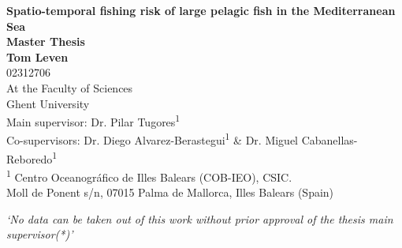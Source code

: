 \begin{titlepage}
	\begin{center}
		{\LARGE \textbf{Spatio-temporal fishing risk of large pelagic fish in the Mediterranean Sea}}\\[1cm]

		\textbf{Master Thesis}\\
		\textbf{Tom Leven}\\[0.5cm]
		02312706\\[1.5cm]

		At the Faculty of Sciences\\ Ghent University\\[1.5cm]

		Main supervisor: Dr. Pilar Tugores\textsuperscript{1}\\ Co-supervisors: Dr. Diego
		Alvarez-Berastegui\textsuperscript{1} \& Dr. Miguel Cabanellas-Reboredo\textsuperscript{1}\\[1cm]

		\textsuperscript{1} \small{Centro Oceanográfico de Illes Balears (COB-IEO), CSIC\@.\\Moll de Ponent s/n, 07015 Palma de Mallorca, Illes Balears (Spain)}

	\end{center}

\end{titlepage}
\restoregeometry
\newpage
\thispagestyle{empty}
\vspace*{\fill}
\begin{center}
	\textit{‘No data can be taken out of this work without prior approval of the thesis main supervisor(*)’}
\end{center}
\vspace*{\fill}